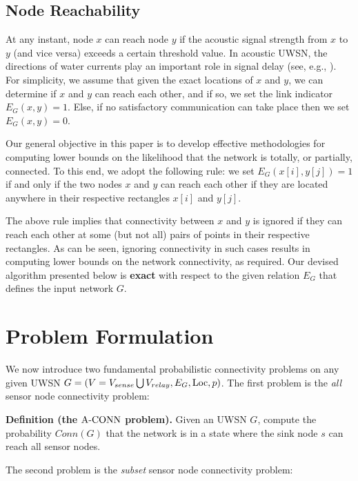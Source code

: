 \subsection{Node Reachability}

At any instant, node $x$ can reach node $y$ if the acoustic signal strength
from $x$ to $y$ (and vice versa) exceeds a certain threshold value.
%
In acoustic UWSN, the directions of water currents play an important role
in signal delay (see, e.g., \cite{pu2013comparing}).
%
For simplicity, we assume that given the exact locations of $x$ and $y$,
we can determine if $x$ and $y$ can reach each other, and if so, we
set the link indicator $E_G (x,y)= 1$.
%
Else, if no satisfactory communication can take place then
we set $E_G (x,y)= 0$.


Our general objective in this paper is to develop effective methodologies
for computing lower bounds on the likelihood that the network is totally,
or partially, connected.
%
To this end, we adopt the following rule: we set $E_G(x[i],y[j])= 1$
if and only if the two nodes $x$ and $y$ can reach each other if
they are located anywhere in their respective rectangles $x[i]$ and $y[j]$.


The above rule implies that connectivity between $x$ and $y$ is ignored if 
they can reach each other at some (but not all) pairs of points in their
respective rectangles.
%
As can be seen, ignoring connectivity in such cases results
in computing lower bounds on the network connectivity, as required.
%
Our devised algorithm presented below is {\bf exact} with respect to
the given relation $E_G$ that defines the input network $G$.


\section{Problem Formulation}

We now introduce two fundamental probabilistic connectivity problems
on any given UWSN $G= (V= V_{sense} \bigcup V_{relay}, E_G, {\mathrm {Loc}}, p)$.
%
The first problem is the {\em all} sensor node connectivity problem:

\nwline
{\bf Definition (the ${\mathrm {A\mbox{-}CONN}}$ problem).}
    Given an UWSN $G$, compute the probability $Conn(G)$ that the network
    is in a state where the sink node $s$ can reach all sensor nodes.     
\IEEEQED

\nwline
The second problem is the {\em subset} sensor node connectivity problem:

